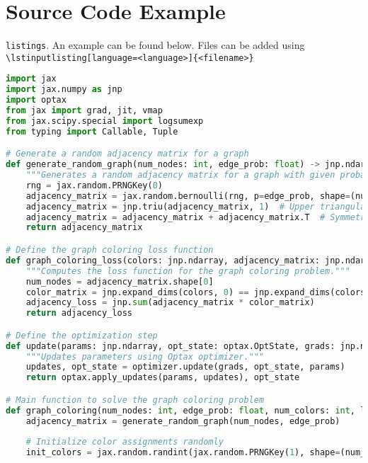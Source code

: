 \chapter{Source Code Example}

{\normalfont\texttt{listings}}. An example can be found below. Files can be added using \\ {\normalfont\texttt{\textbackslash lstinputlisting[language=<language>]\{<filename>\}}}

\begin{lstlisting}[language=Python]
import jax
import jax.numpy as jnp
import optax
from jax import grad, jit, vmap
from jax.scipy.special import logsumexp
from typing import Callable, Tuple

# Generate a random adjacency matrix for a graph
def generate_random_graph(num_nodes: int, edge_prob: float) -> jnp.ndarray:
    """Generates a random adjacency matrix for a graph with given probability of edge existence."""
    rng = jax.random.PRNGKey(0)
    adjacency_matrix = jax.random.bernoulli(rng, p=edge_prob, shape=(num_nodes, num_nodes))
    adjacency_matrix = jnp.triu(adjacency_matrix, 1)  # Upper triangular to avoid self-loops
    adjacency_matrix = adjacency_matrix + adjacency_matrix.T  # Symmetrize
    return adjacency_matrix

# Define the graph coloring loss function
def graph_coloring_loss(colors: jnp.ndarray, adjacency_matrix: jnp.ndarray) -> jnp.ndarray:
    """Computes the loss function for the graph coloring problem."""
    num_nodes = adjacency_matrix.shape[0]
    color_matrix = jnp.expand_dims(colors, 0) == jnp.expand_dims(colors, 1)
    adjacency_loss = jnp.sum(adjacency_matrix * color_matrix)
    return adjacency_loss

# Define the optimization step
def update(params: jnp.ndarray, opt_state: optax.OptState, grads: jnp.ndarray, optimizer: optax.GradientTransformation) -> Tuple[jnp.ndarray, optax.OptState]:
    """Updates parameters using Optax optimizer."""
    updates, opt_state = optimizer.update(grads, opt_state, params)
    return optax.apply_updates(params, updates), opt_state

# Main function to solve the graph coloring problem
def graph_coloring(num_nodes: int, edge_prob: float, num_colors: int, learning_rate: float, num_steps: int):
    adjacency_matrix = generate_random_graph(num_nodes, edge_prob)
    
    # Initialize color assignments randomly
    init_colors = jax.random.randint(jax.random.PRNGKey(1), shape=(num_nodes,), minval=0, maxval=num_colors)
    

\end{lstlisting}

